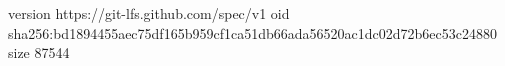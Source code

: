 version https://git-lfs.github.com/spec/v1
oid sha256:bd1894455aec75df165b959cf1ca51db66ada56520ac1dc02d72b6ec53c24880
size 87544
